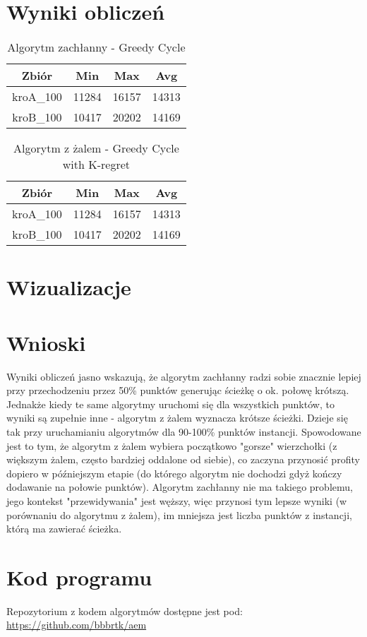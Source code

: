\documentclass{article}
\begin{document}
\section{Wyniki obliczeń}

\begin{table}[h!]
\centering
\begin{tabular}{ |c|c|c|c| } 
 \hline
 Zbiór & Min & Max & Avg \\ 
  \hline
 kroA_{100} & 11284 & 16157 & 14313 \\ 
  \hline
 kroB_{100} & 10417 & 20202 & 14169 \\ 
 \hline
\end{tabular}
\caption{Algorytm zachłanny - Greedy Cycle}
\end{table}

\begin{table}[h!]
\centering
\begin{tabular}{ |c|c|c|c| } 
 \hline
 Zbiór & Min & Max & Avg \\ 
  \hline
 kroA_{100} & 11284 & 16157 & 14313 \\ 
  \hline
 kroB_{100} & 10417 & 20202 & 14169 \\ 
 \hline
\end{tabular}
\caption{Algorytm z żalem - Greedy Cycle with K-regret}
\end{table}

\section{Wizualizacje}


\section{Wnioski}

    Wyniki obliczeń jasno wskazują, że algorytm zachłanny radzi sobie znacznie lepiej przy przechodzeniu przez 50\% punktów generując ścieżkę o ok. połowę krótszą. Jednakże kiedy te same algorytmy uruchomi się dla wszystkich punktów, to wyniki są zupełnie inne - algorytm z żalem wyznacza krótsze ścieżki. Dzieje się tak przy uruchamianiu algorytmów dla 90-100\% punktów instancji. Spowodowane jest to tym, że algorytm z żalem wybiera początkowo "gorsze" wierzchołki (z większym żalem, często bardziej oddalone od siebie), co zaczyna przynosić profity dopiero w późniejszym etapie (do którego algorytm nie dochodzi gdyż kończy dodawanie na połowie punktów). Algorytm zachłanny nie ma takiego problemu, jego kontekst "przewidywania" jest węższy, więc przynosi tym lepsze wyniki (w porównaniu do algorytmu z żalem), im mniejsza jest liczba punktów z instancji, którą ma zawierać ścieżka.

\section{Kod programu}

    Repozytorium z kodem algorytmów dostępne jest pod: \url{https://github.com/bbbrtk/aem}
\end{document}
